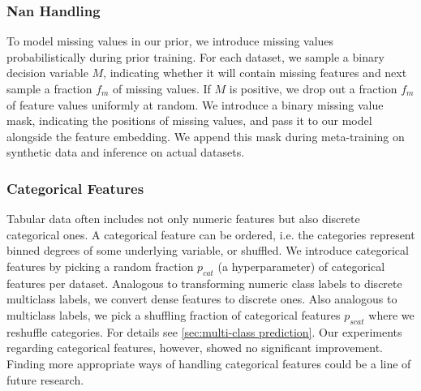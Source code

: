 \documentclass{article}
\begin{document}
\subsubsection{Nan Handling}
To model missing values in our prior, we introduce missing values probabilistically during prior training. For each dataset, we sample a binary decision variable $M$, indicating whether it will contain missing features and next sample a fraction $f_m$ of missing values. If $M$ is positive, we drop out a fraction $f_m$ of feature values uniformly at random.
We introduce a binary missing value mask, indicating the positions of missing values, and pass it to our model alongside the feature embedding. We append this mask during meta-training on synthetic data and inference on actual datasets.

\subsubsection{Categorical Features}
Tabular data often includes not only numeric features but also discrete categorical ones. A categorical feature can be ordered, i.e. the categories represent binned degrees of some underlying variable, or shuffled. We introduce categorical features by picking a random fraction $p_{cat}$ (a hyperparameter) of categorical features per dataset. Analogous to transforming numeric class labels to discrete multiclass labels, we convert dense features to discrete ones. Also analogous to multiclass labels, we pick a shuffling fraction of categorical features $p_{scat}$ where we reshuffle categories. For details see \ref{sec:multi-class prediction}. Our experiments regarding categorical features, however, showed no significant improvement. Finding more appropriate ways of handling categorical features could be a line of future research.
\end{document}
